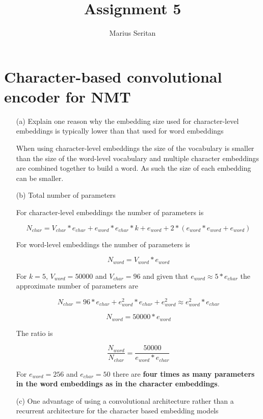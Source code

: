 \documentclass{article}
\begin{document}
\title{Assignment 5}
\author{Marius Seritan}
\maketitle

\section{Character-based convolutional encoder for NMT}

\begin{enumerate}

\item[(a)]{Explain one reason why the embedding size used for character-level embeddings is typically lower than that used for word embeddings}

When using character-level embeddings the size of the vocabulary is smaller than the size of the word-level vocabulary and multiple character embeddings are combined together to build a word. As such the size of each embedding can be smaller.

\item[(b)]{Total number of parameters}

For character-level embeddings the number of parameters is 

$$ N_{char} = V_{char} * e_{char} + e_{word} * e_{char} * k + e_{word} + 2 * (e_{word}*e_{word} + e_{word}) $$

For word-level embeddings the number of parameters is

$$ N_{word} = V_{word} * e_{word} $$

For $k = 5$, $V_{word} = 50000$ and $V_{char} = 96$ and given that $e_{word} \approx 5* e_{char}$ the approximate number of parameters are

$$ N_{char} = 96 * e_{char} + e_{word}^2*e_{char} + e_{word}^2 \approx e_{word}^2*e_{char} $$

$$ N_{word} = 50000 * e_{word} $$

The ratio is 

$$\frac{N_{word}}{N_{char}} = \frac{50000}{e_{word}*e_{char}}$$

For $e_{word} = 256$ and $e_{char} = 50$ there are \textbf{four times as many parameters in the word embeddings as in the character embeddings}.


\item[(c)]{One advantage of using a convolutional architecture rather than a recurrent architecture for the character based embedding models}


\end{enumerate}
\end{document}
